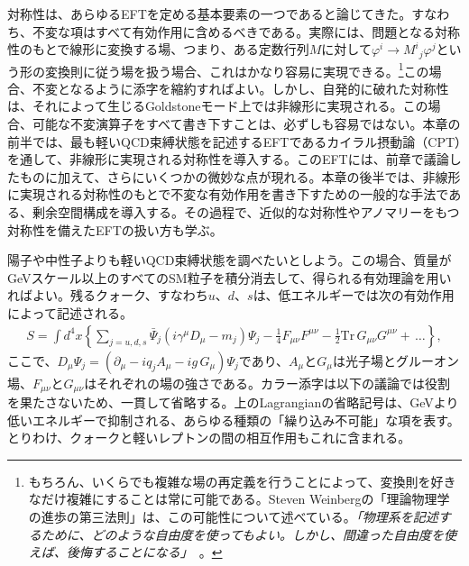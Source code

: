 

対称性は、あらゆるEFTを定める基本要素の一つであると論じてきた。すなわち、不変な項はすべて有効作用に含めるべきである。実際には、問題となる対称性のもとで線形に変換する場、つまり、ある定数行列$M$に対して$\varphi^i \to M^i{}_j \varphi^j$という形の変換則に従う場を扱う場合、これはかなり容易に実現できる。\footnote{もちろん、いくらでも複雑な場の再定義を行うことによって、変換則を好きなだけ複雑にすることは常に可能である。Steven Weinbergの「理論物理学の進歩の第三法則」は、この可能性について述べている。{\it 「物理系を記述するために、どのような自由度を使ってもよい。しかし、間違った自由度を使えば、後悔することになる」}~\cite{Weinberg:1981qq}。}この場合、不変となるように添字を縮約すればよい。しかし、自発的に破れた対称性は、それによって生じるGoldstoneモード上では非線形に実現される。この場合、可能な不変演算子をすべて書き下すことは、必ずしも容易ではない。本章の前半では、最も軽いQCD束縛状態を記述するEFTであるカイラル摂動論（CPT）を通して、非線形に実現される対称性を導入する。このEFTには、前章で議論したものに加えて、さらにいくつかの微妙な点が現れる。本章の後半では、非線形に実現される対称性のもとで不変な有効作用を書き下すための一般的な手法である、剰余空間構成を導入する。その過程で、近似的な対称性やアノマリーをもつ対称性を備えたEFTの扱い方も学ぶ。



 \label{sec: CPT}



陽子や中性子よりも軽いQCD束縛状態を調べたいとしよう。この場合、質量がGeVスケール以上のすべてのSM粒子を積分消去して、得られる有効理論を用いればよい。残るクォーク、すなわち$u$、$d$、$s$は、低エネルギーでは次の有効作用によって記述される。
%
\begin{align} \label{SM action below 1 GeV}
	S = \int d^4 x \left\{ \sum_{j=u,d,s} \bar \Psi_j (i \gamma^\mu D_\mu - m_j ) \Psi_j - \frac{1}{4} F_{\mu\nu} F^{\mu\nu} - \frac{1}{2} \mbox{Tr} \, G_{\mu\nu} G^{\mu\nu} + \, \dots \right\} , 
\end{align}
%
ここで、$D_\mu \Psi_j = (\partial_\mu - i q_j A_\mu - i g \, G_\mu ) \Psi_j$であり、$A_\mu$と$G_\mu$は光子場とグルーオン場、$F_{\mu\nu}$と$G_{\mu\nu}$はそれぞれの場の強さである。カラー添字は以下の議論では役割を果たさないため、一貫して省略する。上のLagrangianの省略記号は、GeVより低いエネルギーで抑制される、あらゆる種類の「繰り込み不可能」な項を表す。とりわけ、クォークと軽いレプトンの間の相互作用もこれに含まれる。

